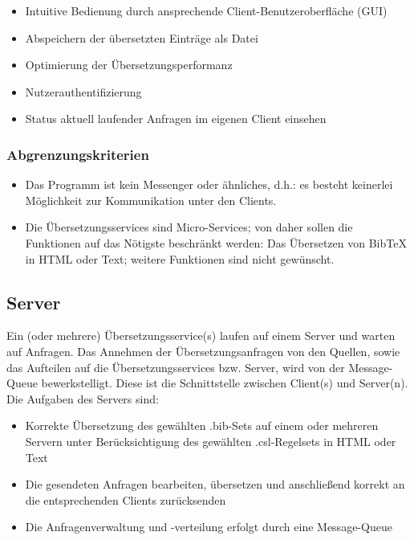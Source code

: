 \documentclass[11pt]{article} %
\begin{document}
\begin{itemize}
\item{Intuitive Bedienung durch ansprechende Client-Benutzeroberfläche (GUI)}
\item{Abspeichern der übersetzten Einträge als Datei}
\item{Optimierung der Übersetzungsperformanz}
\item{Nutzerauthentifizierung}
\item{Status aktuell laufender Anfragen im eigenen Client einsehen}
\end{itemize}

\subsubsection{Abgrenzungskriterien}

\begin{itemize}
\item{Das Programm ist kein Messenger oder ähnliches, d.h.: es besteht keinerlei Möglichkeit zur
Kommunikation unter den Clients.}
\item{Die Übersetzungsservices sind Micro-Services; von daher sollen die Funktionen auf das Nötigste beschränkt werden: Das Übersetzen von BibTeX in HTML oder Text; weitere Funktionen sind nicht gewünscht.}
\end{itemize}

\subsection{Server}

Ein (oder mehrere) Übersetzungsservice(s) laufen auf einem Server und warten auf Anfragen. Das
Annehmen der Übersetzungsanfragen von den Quellen, sowie das Aufteilen auf die
Übersetzungsservices bzw. Server, wird von der Message-Queue bewerkstelligt. Diese ist die
Schnittstelle zwischen Client(s) und Server(n). Die Aufgaben des Servers sind:

\begin{itemize}
\item{Korrekte Übersetzung des gewählten .bib-Sets auf einem oder mehreren Servern
unter Berücksichtigung des gewählten .csl-Regelsets in HTML oder Text}
\item{Die gesendeten Anfragen bearbeiten, übersetzen und anschließend korrekt an die
entsprechenden Clients zurücksenden}
\item{Die Anfragenverwaltung und -verteilung erfolgt durch eine Message-Queue}
\end{itemize}
\end{document}

